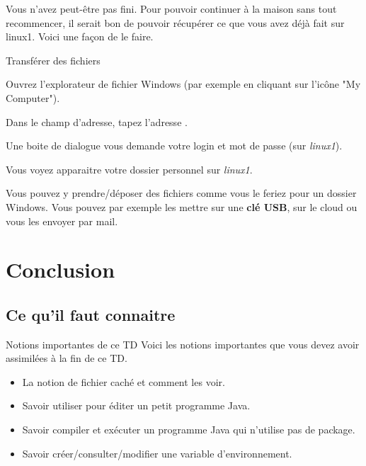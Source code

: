 \documentclass[a4paper,11pt]{style-esi/td}
\begin{document}
	Vous n'avez peut-être pas fini. Pour pouvoir continuer à la maison sans tout recommencer, 
    il serait bon de pouvoir récupérer ce que vous avez déjà fait sur linux1.
	Voici une façon de le faire.			
				
	\begin{Tutoriel}{Transférer des fichiers}
	\begin{steps}		
		\item 
			Ouvrez l'explorateur de fichier Windows (par exemple en cliquant sur l'icône "My Computer").
		\item 
			Dans le champ d'adresse, tapez l'adresse .
		\item 
			Une boite de dialogue vous demande votre login et mot de passe (sur \textit{linux1}).
		\item 
			Vous voyez apparaitre votre dossier personnel sur \textit{linux1}. 
		\item 
			Vous pouvez y prendre/déposer des fichiers comme vous le feriez pour un dossier Windows. 
			Vous pouvez par exemple les mettre sur une \textbf{clé USB},
			sur le cloud ou vous les envoyer par mail.
	\end{steps}
	\end{Tutoriel}			

\section{Conclusion}

	\subsection{Ce qu'il faut connaitre}

		\begin{theorie}{Notions importantes de ce TD}
			Voici les notions importantes que vous devez avoir assimilées à la fin de ce TD.
			\begin{itemize}
			\item 
				La notion de fichier caché et comment les voir.
			\item 
				Savoir utiliser  pour éditer un petit programme Java.
			\item 
				Savoir compiler et exécuter un programme Java 
				qui n'utilise pas de package.
			\item 
				Savoir créer/consulter/modifier une variable d'environnement.
			\end{itemize}
		\end{theorie}
\end{document}
